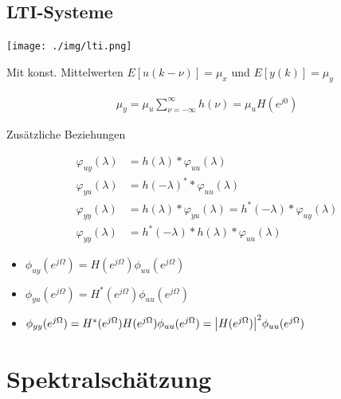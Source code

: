 \documentclass[10pt,a4paper]{article}
\begin{document}
\subsection{LTI-Systeme}
  \begin{center}
      \texttt{[image: ./img/lti.png]}
  \end{center}
Mit konst. Mittelwerten $E[u(k-\nu)]=\mu_x$ und $E[y(k)]=\mu_y$
  \begin{mdframed}[style=exercise]
    \begin{align}
        \mu_y = \mu_u \sum_{\nu=-\infty}^{\infty} h(\nu) = \mu_u H(e^{j0})
    \end{align}
  \end{mdframed}
  Zusätzliche Beziehungen
  \begin{mdframed}[style=exercise]
    \begin{align}
        \varphi_{uy}(\lambda) &= h(\lambda)*\varphi_{uu}(\lambda) \\
        \varphi_{yu}(\lambda) &= h(-\lambda)^**\varphi_{uu}(\lambda) \\
        \varphi_{yy}(\lambda) &= h(\lambda)*\varphi_{yu}(\lambda) = h^*(-\lambda)*\varphi_{uy}(\lambda) \\
        \varphi_{yy}(\lambda) &= h^*(-\lambda)*h(\lambda)*\varphi_{uu}(\lambda)
    \end{align}
  \end{mdframed}
  \begin{itemize}
      \item $\phi_{uy}(e^{j\Omega}) = H(e^{j\Omega})\phi_{uu}(e^{j\Omega})$
      \item $\phi_{yu}(e^{j\Omega}) = H^*(e^{j\Omega})\phi_{uu}(e^{j\Omega})$
      \item $\phi_{yy}(e^{j\Omega}) = H^*(e^{j\Omega})H(e^{j\Omega})\phi_{uu}(e^{j\Omega}) =\abs{H(e^{j\Omega})}^2 \phi_{uu}(e^{j\Omega}) $ 
  \end{itemize}
  \section{Spektralschätzung}
\end{document}
